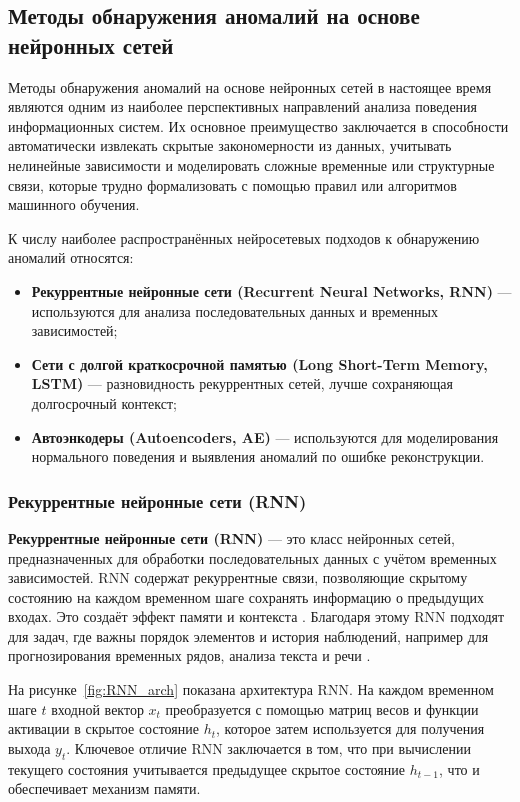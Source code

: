 \subsection{Методы обнаружения аномалий на основе нейронных сетей}

Методы обнаружения аномалий на основе нейронных сетей в настоящее время являются одним из наиболее перспективных направлений анализа поведения информационных систем. Их основное преимущество заключается в способности автоматически извлекать скрытые закономерности из данных, учитывать нелинейные зависимости и моделировать сложные временные или структурные связи, которые трудно формализовать с помощью правил или алгоритмов машинного обучения.

К числу наиболее распространённых нейросетевых подходов к обнаружению аномалий относятся:

\begin{itemize}
    \item \textbf{Рекуррентные нейронные сети (Recurrent Neural Networks, RNN)} — используются для анализа последовательных данных и временных зависимостей;
    \item \textbf{Сети с долгой краткосрочной памятью (Long Short-Term Memory, LSTM)} — разновидность рекуррентных сетей, лучше сохраняющая долгосрочный контекст;
    \item \textbf{Автоэнкодеры (Autoencoders, AE)} — используются для моделирования нормального поведения и выявления аномалий по ошибке реконструкции.
\end{itemize}

\subsubsection{Рекуррентные нейронные сети (RNN)}

\textbf{Рекуррентные нейронные сети (RNN)} — это класс нейронных сетей, предназначенных для обработки последовательных данных с учётом временных зависимостей. RNN содержат рекуррентные связи, позволяющие скрытому состоянию на каждом временном шаге сохранять информацию о предыдущих входах. Это создаёт эффект памяти и контекста \cite{RNN}. Благодаря этому RNN подходят для задач, где важны порядок элементов и история наблюдений, например для прогнозирования временных рядов, анализа текста и речи \cite{RNNs_and_LSTMs}.

На рисунке~\ref{fig:RNN_arch} показана архитектура RNN. На каждом временном шаге $t$ входной вектор $x_t$ преобразуется с помощью матриц весов и функции активации в скрытое состояние $h_t$, которое затем используется для получения выхода $y_t$. Ключевое отличие RNN заключается в том, что при вычислении текущего состояния учитывается предыдущее скрытое состояние $h_{t-1}$, что и обеспечивает механизм памяти.

